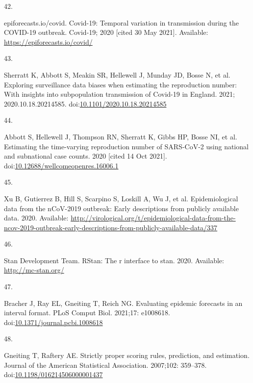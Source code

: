 \documentclass[10pt,letterpaper]{article}
\newlength{\cslhangindent}
\newlength{\csllabelwidth}
\newlength{\cslentryspacingunit} %
\newenvironment{CSLReferences}[2] %
 {%
  \setlength{\parindent}{0pt}
  \ifodd #1
  \let\oldpar\par
  \def\par{\hangindent=\cslhangindent\oldpar}
  \fi
  \setlength{\parskip}{#2\cslentryspacingunit}
 }%
 {}
\newcommand{\CSLLeftMargin}[1]{\parbox[t]{\csllabelwidth}{#1}}
\newcommand{\CSLRightInline}[1]{\parbox[t]{\linewidth - \csllabelwidth}{#1}\break}
\begin{document}
\begin{CSLReferences}{0}{0}
\leavevmode{}%
\CSLLeftMargin{42. }%
\CSLRightInline{epiforecasts.io/covid. Covid-19: {Temporal} variation in
transmission during the {COVID-19} outbreak. {Covid-19}; 2020 {[}cited
30 May 2021{]}. Available: \url{https://epiforecasts.io/covid/}}

\leavevmode{}%
\CSLLeftMargin{43. }%
\CSLRightInline{Sherratt K, Abbott S, Meakin SR, Hellewell J, Munday JD,
Bosse N, et al. Exploring surveillance data biases when estimating the
reproduction number: With insights into subpopulation transmission of
{Covid-19} in {England}. 2021; 2020.10.18.20214585.
doi:\href{https://doi.org/10.1101/2020.10.18.20214585}{10.1101/2020.10.18.20214585}}

\leavevmode{}%
\CSLLeftMargin{44. }%
\CSLRightInline{Abbott S, Hellewell J, Thompson RN, Sherratt K, Gibbs
HP, Bosse NI, et al. Estimating the time-varying reproduction number of
{SARS-CoV-2} using national and subnational case counts. 2020 {[}cited
14 Oct 2021{]}.
doi:\href{https://doi.org/10.12688/wellcomeopenres.16006.1}{10.12688/wellcomeopenres.16006.1}}

\leavevmode{}%
\CSLLeftMargin{45. }%
\CSLRightInline{Xu B, Gutierrez B, Hill S, Scarpino S, Loskill A, Wu J,
et al. Epidemiological data from the nCoV-2019 outbreak: Early
descriptions from publicly available data. 2020. Available:
\url{http://virological.org/t/epidemiological-data-from-the-ncov-2019-outbreak-early-descriptions-from-publicly-available-data/337}}

\leavevmode{}%
\CSLLeftMargin{46. }%
\CSLRightInline{Stan Development Team. RStan: The r interface to stan.
2020. Available: \url{http://mc-stan.org/}}

\leavevmode{}%
\CSLLeftMargin{47. }%
\CSLRightInline{Bracher J, Ray EL, Gneiting T, Reich NG. Evaluating
epidemic forecasts in an interval format. PLoS Comput Biol. 2021;17:
e1008618.
doi:\href{https://doi.org/10.1371/journal.pcbi.1008618}{10.1371/journal.pcbi.1008618}}

\leavevmode{}%
\CSLLeftMargin{48. }%
\CSLRightInline{Gneiting T, Raftery AE. Strictly proper scoring rules,
prediction, and estimation. Journal of the American Statistical
Association. 2007;102: 359--378.
doi:\href{https://doi.org/10.1198/016214506000001437}{10.1198/016214506000001437}}


\end{CSLReferences}
\end{document}
